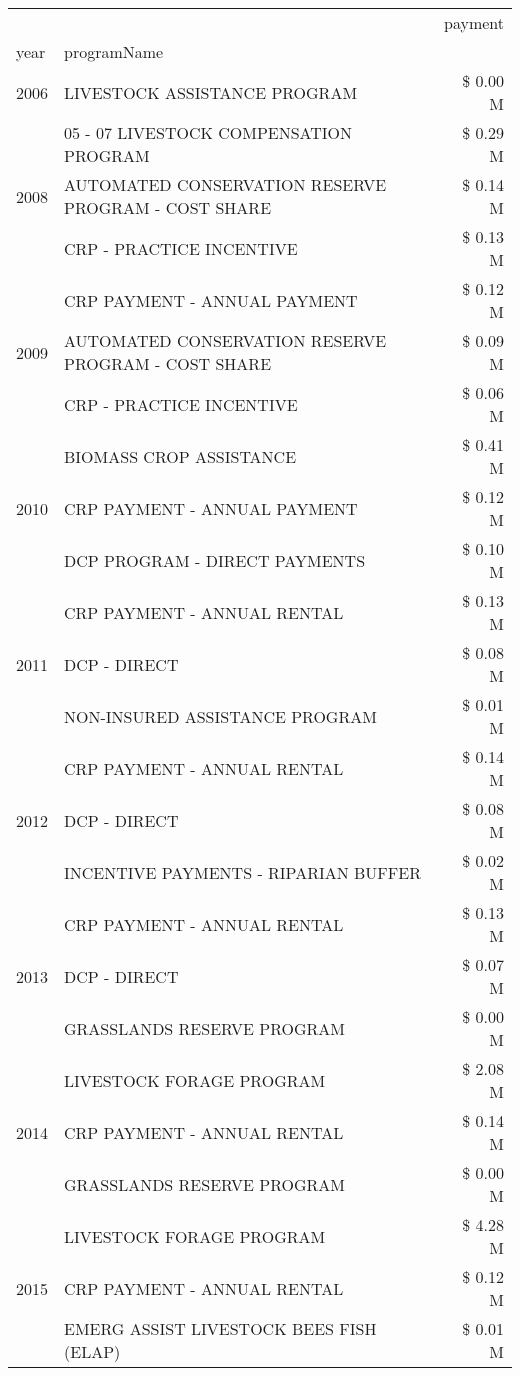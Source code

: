 \begin{tabular}{llr}
\toprule
 &  & payment \\
year & programName &  \\
\midrule
2006 & LIVESTOCK ASSISTANCE PROGRAM & \$ 0.00 M \\
\cline{1-3}
\multirow[t]{3}{*}{2008} & 05 - 07 LIVESTOCK COMPENSATION PROGRAM & \$ 0.29 M \\
 & AUTOMATED CONSERVATION RESERVE PROGRAM - COST SHARE & \$ 0.14 M \\
 & CRP - PRACTICE INCENTIVE & \$ 0.13 M \\
\cline{1-3}
\multirow[t]{3}{*}{2009} & CRP PAYMENT - ANNUAL PAYMENT & \$ 0.12 M \\
 & AUTOMATED CONSERVATION RESERVE PROGRAM - COST SHARE & \$ 0.09 M \\
 & CRP - PRACTICE INCENTIVE & \$ 0.06 M \\
\cline{1-3}
\multirow[t]{3}{*}{2010} & BIOMASS CROP ASSISTANCE & \$ 0.41 M \\
 & CRP PAYMENT - ANNUAL PAYMENT & \$ 0.12 M \\
 & DCP PROGRAM - DIRECT PAYMENTS & \$ 0.10 M \\
\cline{1-3}
\multirow[t]{3}{*}{2011} & CRP PAYMENT - ANNUAL RENTAL & \$ 0.13 M \\
 & DCP - DIRECT & \$ 0.08 M \\
 & NON-INSURED ASSISTANCE PROGRAM & \$ 0.01 M \\
\cline{1-3}
\multirow[t]{3}{*}{2012} & CRP PAYMENT - ANNUAL RENTAL & \$ 0.14 M \\
 & DCP - DIRECT & \$ 0.08 M \\
 & INCENTIVE PAYMENTS - RIPARIAN BUFFER & \$ 0.02 M \\
\cline{1-3}
\multirow[t]{3}{*}{2013} & CRP PAYMENT - ANNUAL RENTAL & \$ 0.13 M \\
 & DCP - DIRECT & \$ 0.07 M \\
 & GRASSLANDS RESERVE PROGRAM & \$ 0.00 M \\
\cline{1-3}
\multirow[t]{3}{*}{2014} & LIVESTOCK FORAGE PROGRAM & \$ 2.08 M \\
 & CRP PAYMENT - ANNUAL RENTAL & \$ 0.14 M \\
 & GRASSLANDS RESERVE PROGRAM & \$ 0.00 M \\
\cline{1-3}
\multirow[t]{3}{*}{2015} & LIVESTOCK FORAGE PROGRAM & \$ 4.28 M \\
 & CRP PAYMENT - ANNUAL RENTAL & \$ 0.12 M \\
 & EMERG ASSIST LIVESTOCK BEES FISH (ELAP) & \$ 0.01 M \\

\end{tabular}
